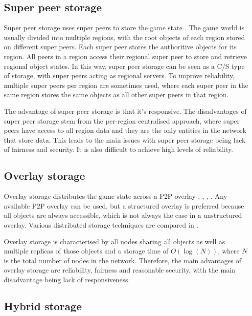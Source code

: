 \documentclass[10pt,a4paper,conference]{IEEEtran}
\begin{document}
\subsection{Super peer storage}

Super peer storage uses super peers to store the game state \cite{knutsson_p2p_first}. The game world is usually divided into multiple regions, with the root objects of each region stored on different super peers. Each super peer stores the authoritive objects for its region. All peers in a region access their regional super peer to store and retrieve regional object states. In this way, super peer storage can be seen as a C/S type of storage, with super peers acting as regional servers. To improve reliability, multiple super peers per region are sometimes used, where each super peer in the same region stores the same objects as all other super peers in that region.

The advantage of super peer storage is that it's responsive. The disadvantages of super peer storage stem from the per-region centralised approach,
where super peers have access to all region data and they are the only entities in the network that store data. This leads to the main issues with
super peer storage being lack of fairness and security. It is also difficult to achieve high levels of reliability.

\subsection{Overlay storage}

Overlay storage distributes the game state across a P2P overlay \cite{Douglas05enablingmassively}, \cite{using_freenet_storage}, \cite{Fan_phd},
\cite{past_storage_focus}. Any available P2P overlay can be used, but a structured overlay is preferred because all objects are always accessible,
which is not always the case in a unstructured overlay. Various distributed storage techniques are compared in
\cite{Hasan_distributed_storage_survey}.

Overlay storage is characterised by all nodes sharing all objects as well as multiple replicas of those objects and a storage time of $O(\log(N))$,
where $N$ is the total number of nodes in the network. Therefore, the main advantages of overlay storage are reliability, fairness and reasonable
security, with the main disadvantage being lack of responsiveness.

\subsection{Hybrid storage}
\end{document}
